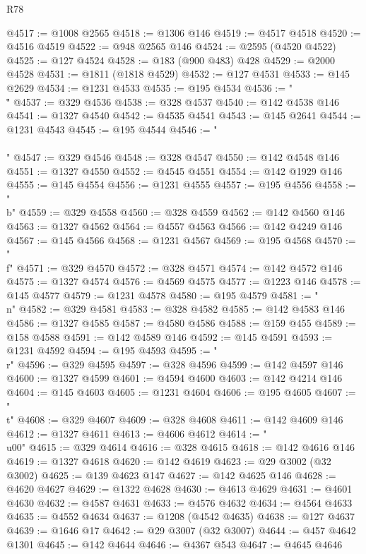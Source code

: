 \begin{lexlean}{R78}
\begin{coremodule}
@4517 := @1008 @2565
@4518 := @1306 @146
@4519 := @4517 @4518
@4520 := @4516 @4519
@4522 := @948 @2565 @146
@4524 := @2595 (@4520 @4522)
@4525 := @127 @4524
@4528 := @183 (@900 @483) @428
@4529 := @2000 @4528
@4531 := @1811 (@1818 @4529)
@4532 := @127 @4531
@4533 := @145 @2629
@4534 := @1231 @4533
@4535 := @195 @4534
@4536 := "\\\""
@4537 := @329 @4536
@4538 := @328 @4537
@4540 := @142 @4538 @146
@4541 := @1327 @4540
@4542 := @4535 @4541
@4543 := @145 @2641
@4544 := @1231 @4543
@4545 := @195 @4544
@4546 := "\\\\"
@4547 := @329 @4546
@4548 := @328 @4547
@4550 := @142 @4548 @146
@4551 := @1327 @4550
@4552 := @4545 @4551
@4554 := @142 @1929 @146
@4555 := @145 @4554
@4556 := @1231 @4555
@4557 := @195 @4556
@4558 := "\\b"
@4559 := @329 @4558
@4560 := @328 @4559
@4562 := @142 @4560 @146
@4563 := @1327 @4562
@4564 := @4557 @4563
@4566 := @142 @4249 @146
@4567 := @145 @4566
@4568 := @1231 @4567
@4569 := @195 @4568
@4570 := "\\f"
@4571 := @329 @4570
@4572 := @328 @4571
@4574 := @142 @4572 @146
@4575 := @1327 @4574
@4576 := @4569 @4575
@4577 := @1223 @146
@4578 := @145 @4577
@4579 := @1231 @4578
@4580 := @195 @4579
@4581 := "\\n"
@4582 := @329 @4581
@4583 := @328 @4582
@4585 := @142 @4583 @146
@4586 := @1327 @4585
@4587 := @4580 @4586
@4588 := @159 @455
@4589 := @158 @4588
@4591 := @142 @4589 @146
@4592 := @145 @4591
@4593 := @1231 @4592
@4594 := @195 @4593
@4595 := "\\r"
@4596 := @329 @4595
@4597 := @328 @4596
@4599 := @142 @4597 @146
@4600 := @1327 @4599
@4601 := @4594 @4600
@4603 := @142 @4214 @146
@4604 := @145 @4603
@4605 := @1231 @4604
@4606 := @195 @4605
@4607 := "\\t"
@4608 := @329 @4607
@4609 := @328 @4608
@4611 := @142 @4609 @146
@4612 := @1327 @4611
@4613 := @4606 @4612
@4614 := "\\u00"
@4615 := @329 @4614
@4616 := @328 @4615
@4618 := @142 @4616 @146
@4619 := @1327 @4618
@4620 := @142 @4619
@4623 := @29 @3002 (@32 @3002)
@4625 := @139 @4623 @147
@4627 := @142 @4625 @146
@4628 := @4620 @4627
@4629 := @1322 @4628
@4630 := @4613 @4629
@4631 := @4601 @4630
@4632 := @4587 @4631
@4633 := @4576 @4632
@4634 := @4564 @4633
@4635 := @4552 @4634
@4637 := @1208 (@4542 @4635)
@4638 := @127 @4637
@4639 := @1646 @17
@4642 := @29 @3007 (@32 @3007)
@4644 := @457 @4642 @1301
@4645 := @142 @4644
@4646 := @4367 @543
@4647 := @4645 @4646

\end{coremodule}
\end{lexlean}
